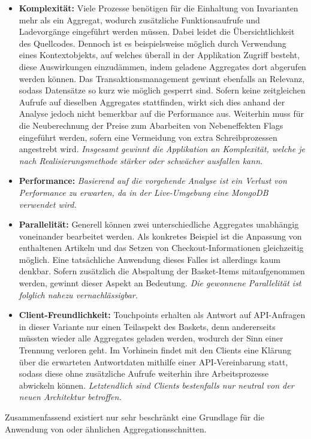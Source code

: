 \begin{itemize}[topsep=-2pt]
	\item \textbf{Komplexität: } {Viele Prozesse benötigen für die Einhaltung von Invarianten mehr als ein Aggregat, wodurch zusätzliche Funktionsaufrufe und Ladevorgänge eingeführt werden müssen. Dabei leidet die Übersichtlichkeit des Quellcodes. Dennoch ist es beispielsweise möglich durch Verwendung eines Kontextobjekts, auf welches überall in der Applikation Zugriff besteht, diese Auswirkungen einzudämmen, indem geladene Aggregates dort abgerufen werden können. Das Transaktionsmanagement gewinnt ebenfalls an Relevanz, sodass Datensätze so kurz wie möglich gesperrt sind. Sofern keine zeitgleichen Aufrufe auf dieselben Aggregates stattfinden, wirkt sich dies anhand der Analyse jedoch nicht bemerkbar auf die Performance aus. Weiterhin muss für die Neuberechnung der Preise zum Abarbeiten von Nebeneffekten Flags eingeführt werden, sofern eine Vermeidung von extra Schreibprozessen angestrebt wird. \emph{Insgesamt gewinnt die Applikation an Komplexität, welche je nach Realisierungsmethode stärker oder schwächer ausfallen kann.}}
	
	\item \textbf{Performance: } { \emph{Basierend auf die vorgehende Analyse ist ein Verlust von Performance zu erwarten, da in der Live-Umgebung eine MongoDB verwendet wird.} }
	
	\item \textbf{Parallelität: } { Generell können zwei unterschiedliche Aggregates unabhängig voneinander bearbeitet werden. Als konkretes Beispiel ist die Anpassung von enthaltenen Artikeln und das Setzen von Checkout-Informationen gleichzeitig möglich. Eine tatsächliche Anwendung dieses Falles ist allerdings kaum denkbar. Sofern zusätzlich die Abspaltung der Basket-Items mitaufgenommen werden, gewinnt dieser Aspekt an Bedeutung. \emph{Die gewonnene Parallelität ist folglich nahezu vernachlässigbar.}}
	\item \textbf{Client-Freundlichkeit: } { Touchpoints erhalten als Antwort auf API-Anfragen in dieser Variante nur einen Teilaspekt des Baskets, denn andererseits müssten wieder alle Aggregates geladen werden, wodurch der Sinn einer Trennung verloren geht. Im Vorhinein findet mit den Clients eine Klärung über die erwarteten Antwortdaten mithilfe einer API-Vereinbarung statt, sodass diese ohne zusätzliche Aufrufe weiterhin ihre Arbeitsprozesse abwickeln können. \emph{Letztendlich sind Clients bestenfalls nur neutral von der neuen Architektur betroffen.}}
\end{itemize}

Zusammenfassend existiert nur sehr beschränkt eine Grundlage für die Anwendung von  oder ähnlichen Aggregationsschnitten.